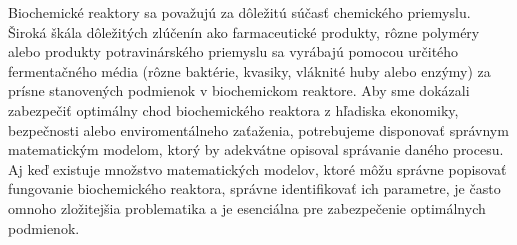 Biochemické reaktory sa považujú za dôležitú súčasť chemického priemyslu. Široká škála dôležitých zlúčenín ako farmaceutické produkty, rôzne polyméry alebo produkty potravinárského priemyslu sa vyrábajú pomocou určitého fermentačného média (rôzne baktérie, kvasiky, vláknité huby alebo enzýmy) za prísne stanovených podmienok v biochemickom reaktore. Aby sme dokázali zabezpečiť optimálny chod biochemického reaktora z hľadiska ekonomiky, bezpečnosti alebo enviromentálneho zaťaženia, potrebujeme disponovať správnym matematickým modelom, ktorý by adekvátne opisoval správanie daného procesu. Aj keď existuje množstvo matematických modelov, ktoré môžu správne popisovať fungovanie biochemického reaktora, správne identifikovať ich parametre, je často omnoho zložitejšia problematika a je esenciálna pre zabezpečenie optimálnych podmienok.
